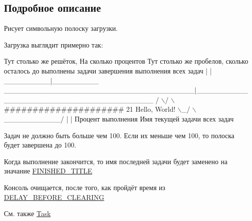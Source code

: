 \subsection{Подробное описание}
Рисует символьную полоску загрузки. 


\begin{DoxyItemize}
\item Загрузка выглядит примерно так\+: 
\begin{DoxyCode}
Тут столько же решёток,
На сколько процентов                 Тут столько же пробелов, сколько осталось до
выполнены задачи                     завершения выполнения всех задач
          |                                                |
 \_\_\_\_\_\_\_\_\_|\_\_\_\_\_\_\_\_\_  \_\_\_\_\_\_\_\_\_\_\_\_\_\_\_\_\_\_\_\_\_\_\_\_\_\_\_\_\_\_\_\_\_\_\_\_\_|\_\_\_\_\_\_\_\_\_\_\_\_\_\_\_\_\_\_\_\_\_\_\_\_\_\_\_\_\_\_\_\_\_\_\_\_\_\_\_
/                   \(\backslash\)/                                                                             \(\backslash\)
#####################                                                                                21%
Hello, World!                                                                                        \(\backslash\)\_/
\(\backslash\)\_\_\_\_\_\_\_\_\_\_\_/                                                                                         |
      |                                                                                      Процент
       выполнения
Имя текущей задачи                                                                           всех задач
\end{DoxyCode}

\item Задач не должно быть больше чем 100. Если их меньше чем 100, то полоска будет завершена до 100.
\item Когда выполнение закончится, то имя последней задачи будет заменено на значание \hyperlink{class_a_s_c_i_i_wars_1_1_console_graphics_1_1_loading_bar_aa75543e5166964ca32750bb66591ab3d}{F\+I\+N\+I\+S\+H\+E\+D\+\_\+\+T\+I\+T\+LE}
\item Консоль очищается, после того, как пройдёт время из \hyperlink{class_a_s_c_i_i_wars_1_1_console_graphics_1_1_loading_bar_ae05f622988d5cebaa3e0c14d45d832fb}{D\+E\+L\+A\+Y\+\_\+\+B\+E\+F\+O\+R\+E\+\_\+\+C\+L\+E\+A\+R\+I\+NG}
\end{DoxyItemize}

\begin{DoxySeeAlso}{См. также}
\hyperlink{class_a_s_c_i_i_wars_1_1_console_graphics_1_1_task}{Task} 
\end{DoxySeeAlso}


